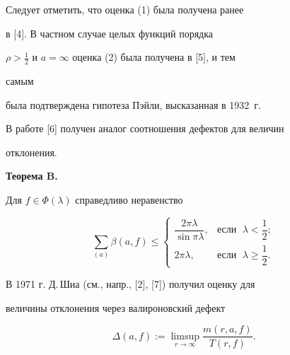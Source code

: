  


Следует отметить, что оценка (1) была получена ранее 


в [4]. В частном случае целых функций порядка 


$\rho>\frac{1}{2}$ и $a=\infty$ оценка (2) была получена в [5], и тем 


самым 


была подтверждена гипотеза Пэйли, высказанная в 1932~г. 


В работе [6] получен аналог соотношения дефектов для величин 


отклонения. 


\medskip 


 


{\bf Теорема B.} {\it 


Для $f\in\Phi(\lambda)$ справедливо неравенство 


$$ 


\sum_{(a)}\beta(a,f)\le 


\begin{cases} 


\dfrac{2\pi\lambda}{\sin\pi\lambda},&\text{если }\; 


\lambda<\dfrac{1}{2};\\[3mm] 


2\pi\lambda,&\text{если }\;\lambda\ge\dfrac{1}{2}. 


\end{cases} 


$$ 


} 


\setcounter{equation}{2} 


 


В 1971 г. Д.\,Шиа (см., напр., [2], [7]) получил оценку для 


величины отклонения через валироновский дефект 


$$ 


\Delta(a,f):=\limsup_{r\to\infty}\frac{m(r,a,f)}{T(r,f)}. 


$$ 


 


